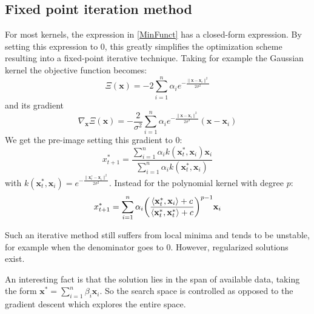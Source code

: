 \documentclass[12pt, letterpaper]{article}
\theoremstyle{definition}
\newcommand{\x}{\mathbf{x}}
\DeclarePairedDelimiter\autobracket{(}{)}
\newcommand{\br}[1]{\autobracket*{#1}}
\begin{document}
\subsection{Fixed point iteration method}
For most kernels, the expression in \autoref{MinFunct} has a closed-form expression. By setting this expression to $0$, this greatly simplifies the optimization scheme resulting into a fixed-point iterative technique. Taking for example the Gaussian kernel the objective function becomes:
\begin{equation}
\Xi(\x) = -2 \sum_{i=1}^n \alpha_i e^{-\frac{\|\x-\x_i\|^2}{2\sigma^2}}
\end{equation}
and its gradient
\begin{equation}
\nabla_\x\Xi(\x) = -\frac{2}{\sigma^2} \sum_{i=1}^n \alpha_i e^{-\frac{\|\x-\x_i\|^2}{2\sigma^2}}(\x - \x_i)
\end{equation}
We get the pre-image setting this gradient to $0$:
\begin{equation}
x^*_{t+1} = \frac{\sum_{i=1}^n \alpha_i k(\x^*_t,\x_i)\x_i}{ \sum_{i=1}^n \alpha_i k(\x^*_t,\x_i)}
\end{equation}
with $k(\x^*_t,\x_i)= e^{-\frac{\|\x_t^*-\x_i\|^2}{2\sigma^2}}$. Instead for the polynomial kernel with degree $p$:
\begin{equation}
x^*_{t+1} =\sum_{i=1}^n   \alpha_i\br{\frac{  \langle\x^*_t,\x_i\rangle+c}{\langle\x^*_t,\x^*_t\rangle+c}}^{p-1}\x_i
\end{equation}

Such an iterative method still suffers from local minima and tends to be unstable, for example when the denominator goes to $0$. However, regularized solutions exist.

An interesting fact is that the solution lies in the span of available data, taking the form $\x^* = \sum_{i=1}^n \beta_i \x_i$. So the search space is controlled as opposed to the gradient descent which explores the entire space.
\end{document}
